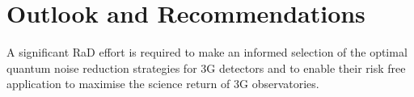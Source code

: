 
\section{Outlook and Recommendations}
A significant  \ac{RaD}   effort is required to make an informed selection of the optimal quantum noise reduction strategies for  \ac{3G}   detectors and to enable their risk free application to maximise the science return of  \ac{3G}   
 observatories. 


